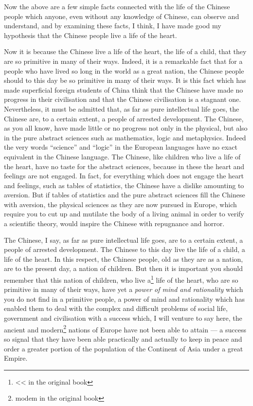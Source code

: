 Now the above are a few simple facts connected with the life of the Chinese people which anyone, even without any knowledge of Chinese, can observe and understand, and by examining these facts, I think, I have made good my hypothesis that the Chinese people live a life of the heart.

Now it is because the Chinese live a life of the heart, the life of a child, that they are so primitive in many of their ways.
Indeed, it is a remarkable fact that for a people who have lived so long in the world as a great nation, the Chinese people should to this day be so primitive in many of their ways.
It is this fact which has made superficial foreign students of China think that the Chinese have made no progress in their civilisation and that the Chinese civilisation is a stagnant one.
Nevertheless, it must be admitted that, as far as pure intellectual life goes, the Chinese are, to a certain extent, a people of arrested development.
The Chinese, as you all know, have made little or no progress not only in the physical, but also in the pure abstract sciences such as mathematics, logic and metaphysics.
Indeed the very words ``science'' and ``logic'' in the European languages have no exact equivalent in the Chinese language.
The Chinese, like children who live a life of the heart, have no taste for the abstract sciences, because in these the heart and feelings are not engaged.
In fact, for everything which does not engage the heart and feelings, such as tables of statistics, the Chinese have a dislike amounting to aversion.
But if tables of statistics and the pure abstract sciences fill the Chinese with aversion, the physical sciences as they are now pursued in Europe, which require you to cut up and mutilate the body of a living animal in order to verify a scientific theory, would inspire the Chinese with repugnance and horror.

The Chinese, I say, as far as pure intellectual life goes, are to a certain extent, a people of arrested development.
The Chinese to this day live the life of a child, a life of the heart.
In this respect, the Chinese people, old as they are as a nation, are to the present day, a nation of children.
But then it is important you should remember that this nation of children, who live a\footnote{<< in the original book} life of the heart, who are so primitive in many of their ways, have yet a \emph{power of mind and rationality} which you do not find in a primitive people, a power of mind and rationality which has enabled them to deal with the complex and difficult problems of social life, government and civilisation with a success which, I will venture to say here, the ancient and modern\footnote{modem in the original book} nations of Europe have not been able to attain --- a success so signal that they have been able practically and actually to keep in peace and order a greater portion of the population of the Continent of Asia under a great Empire.

